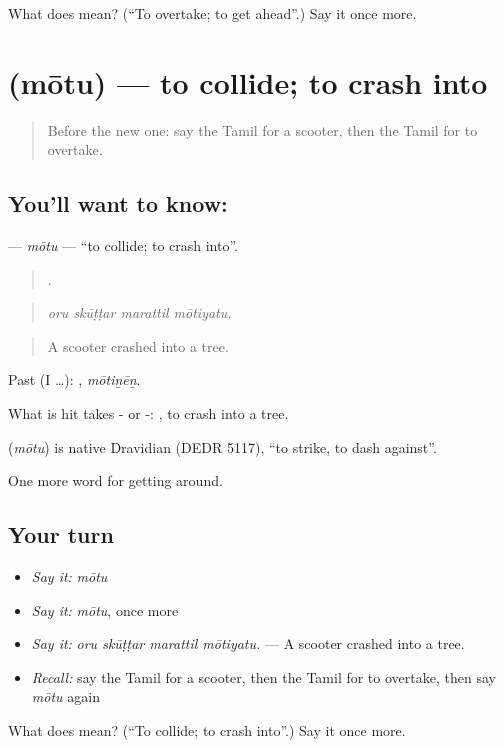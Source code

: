 \begin{tcolorbox}[breakable,colback=teal!4,colframe=teal!35!black,title={Before you move on}]
What does  mean? (\textquotedblleft{}To overtake; to get ahead\textquotedblright{}.) Say it once more.
\end{tcolorbox}
\section[\texorpdfstring{\ta{மோது} (mōtu)}{மோது (mōtu)}]{ (mōtu) — to collide; to crash into}

\label{lesson:TA-C404-motu}



\begin{quote}
Before the new one: say the Tamil for a scooter, then the Tamil for to overtake.
\end{quote}

\subsection*{You'll want to know: }
\textbf{} — \emph{mōtu} — \textquotedblleft{}to collide; to crash into\textquotedblright{}.

\begin{quote}
   .
\end{quote}

\begin{quote}
\emph{oru skūṭṭar marattil mōtiyatu.}
\end{quote}

\begin{quote}
A scooter crashed into a tree.
\end{quote}

Past (I …): , \emph{mōtiṉēṉ}.

What is hit takes - or -:  , to crash into a tree.

\begin{cousinweb}
\textbf{} (\emph{mōtu}) is native Dravidian (DEDR 5117), \textquotedblleft{}to strike, to dash against\textquotedblright{}.
\end{cousinweb}

\begin{grammarlens}[title={What you've built}]
One more word for getting around.
\end{grammarlens}

\subsection*{Your turn}
\begin{itemize}
\raggedright
  \item \emph{Say it:} \emph{mōtu}
  \item \emph{Say it:} \emph{mōtu}, once more
  \item \emph{Say it:} \emph{oru skūṭṭar marattil mōtiyatu.} — A scooter crashed into a tree.
  \item \emph{Recall:} say the Tamil for a scooter, then the Tamil for to overtake, then say \emph{mōtu} again
\end{itemize}

\begin{tcolorbox}[breakable,colback=teal!4,colframe=teal!35!black,title={Before you move on}]
What does  mean? (\textquotedblleft{}To collide; to crash into\textquotedblright{}.) Say it once more.
\end{tcolorbox}
